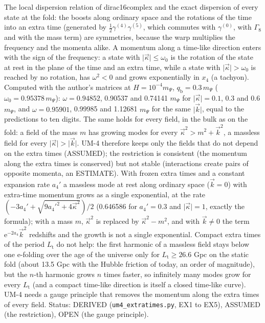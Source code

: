 \documentclass[
  10pt,
]{article}
\begin{document}
The local dispersion relation of dirac16complex and the exact dispersion
of every state at the fold: the boosts along ordinary space and the
rotations of the time into an extra time (generated by
\(\frac12\gamma^{(4)}\gamma^{(5)}\), which commutes with
\(\gamma^{(0)}\), with \(\Gamma_8\) and with the mass term) are
symmetries, because the warp multiplies the frequency and the momenta
alike. A momentum along a time-like direction enters with the sign of
the frequency: a state with \(\lvert\vec\kappa\rvert \le \omega_0\) is
the rotation of the state at rest in the plane of the time and an extra
time, while a state with \(\lvert\vec\kappa\rvert > \omega_0\) is
reached by no rotation, has \(\omega^2 < 0\) and grows exponentially in
\(x_4\) (a tachyon). Computed with the author's matrices at
\(H = 10^{-4}m_\Psi\), \(q_{\mathrm{b}} = 0.3\,m_\Psi\)
(\(\omega_0 = 0.95378\,m_\Psi\)): \(\omega = 0.94852\), 0.90537 and
0.74141 \(m_\Psi\) for \(\lvert\vec\kappa\rvert = 0.1\), 0.3 and 0.6
\(m_\Psi\), and \(\omega = 0.95901\), 0.99985 and 1.12681 \(m_\Psi\) for
the same \(\lvert\vec k\rvert\), equal to the predictions to ten digits.
The same holds for every field, in the bulk as on the fold: a field of
the mass \(m\) has growing modes for every
\(\vec\kappa^2 > m^2 + \vec k^2\), a massless field for every
\(\lvert\vec\kappa\rvert > \lvert\vec k\rvert\). UM-4 therefore keeps
only the fields that do not depend on the extra times (ASSUMED); the
restriction is consistent (the momentum along the extra times is
conserved) but not stable (interactions create pairs of opposite
momenta, an ESTIMATE). With frozen extra times and a constant expansion
rate \(a_4'\) a massless mode at rest along ordinary space
(\(\vec k = 0\)) with extra-time momentum grows as a single exponential,
at the rate \((-3a_4' + \sqrt{9a_4'^2 + 4\vec\kappa^2})/2\) (0.646586
for \(a_4' = 0.3\) and \(\lvert\vec\kappa\rvert = 1\), exactly the
formula); with a mass \(m\), \(\vec\kappa^2\) is replaced by
\(\vec\kappa^2 - m^2\), and with \(\vec k \ne 0\) the term
\(\mathrm{e}^{-2a_4}\vec k^2\) redshifts and the growth is not a single
exponential. Compact extra times of the period \(L_{\mathrm{t}}\) do not
help: the first harmonic of a massless field stays below one e-folding
over the age of the universe only for \(L_{\mathrm{t}} \ge 26.6\) Gpc on
the static fold (about 13.5 Gpc with the Hubble friction of today, an
order of magnitude), but the \(n\)-th harmonic grows \(n\) times faster,
so infinitely many modes grow for every \(L_{\mathrm{t}}\) (and a
compact time-like direction is itself a closed time-like curve). UM-4
needs a gauge principle that removes the momentum along the extra times
of every field. Status: DERIVED (\texttt{um4\_extratimes.py}, EX1 to
EX5), ASSUMED (the restriction), OPEN (the gauge principle).
\end{document}
